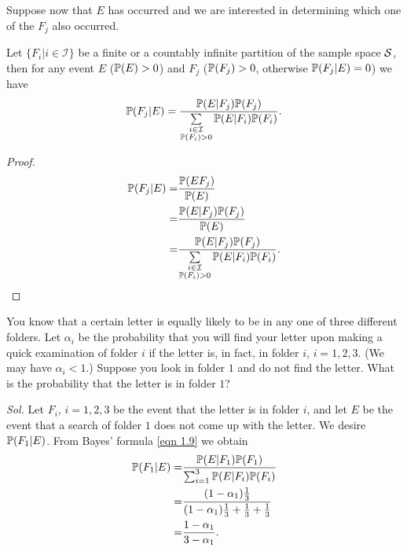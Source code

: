 Suppose now that $E$ has occurred and we are interested in determining which one of the $F_j$ also occurred.

\begin{theorem}
    Let $\{ F_i | i \in \mathcal{I} \}$ be a finite or a countably infinite partition of the sample space $\mathcal{S}$, then for any event $E$ ($ \mathbb{P} (E) > 0$) and $F_j$ ($\mathbb{P} (F_j) > 0$, otherwise $\mathbb{P} (F_j | E) = 0$) we have 
    \begin{equation} \label{eqn 1.9}
        \mathbb{P} (F_j | E) = \frac{\mathbb{P} (E | F_j) \mathbb{P} (F_j)}{\sum\limits_{\substack{i \in \mathcal{I} \\ \mathbb{P} (F_i) > 0}} \mathbb{P} (E | F_i) \mathbb{P} (F_i)}.
    \end{equation}

    \begin{proof}
        \begin{align*}
            \mathbb{P} (F_j | E) = & \frac{\mathbb{P} (E F_j)}{\mathbb{P} (E)} \\ 
            = & \frac{\mathbb{P} (E | F_j) \mathbb{P} (F_j)}{\mathbb{P} (E)} \\ 
            = & \frac{\mathbb{P} (E | F_j) \mathbb{P} (F_j)}{\sum\limits_{\substack{i \in \mathcal{I} \\ \mathbb{P} (F_i) > 0}} \mathbb{P} (E | F_i) \mathbb{P} (F_i)}.
        \end{align*}
    \end{proof}
\end{theorem}

\begin{example}
    You know that a certain letter is equally likely to be in any one of
    three different folders. Let $\alpha_i$ be the probability that you will find your letter upon making a quick examination of folder $i$ if the letter is, in fact, in folder $i$, $i = 1, 2, 3$. (We may have $\alpha_i < 1$.) Suppose you look in folder $1$ and do not find the letter. What is the probability that the letter is in folder $1$?

    \textit{ Sol. } Let $F_i$, $i = 1,2,3$ be the event that the letter is in folder $i$, and let $E$ be the event that a search of folder $1$ does not come up with the letter. We desire $\mathbb{P} (F_1 | E)$. From Bayes' formula \eqref{eqn 1.9} we obtain 
    \begin{align*}
        \mathbb{P} (F_1 | E) = & \frac{\mathbb{P} (E | F_1) \mathbb{P} (F_1)}{\sum_{i = 1}^3 \mathbb{P} (E | F_i) \mathbb{P} (F_i)} \\ 
        = & \frac{(1 - \alpha_1) \frac{1}{3}}{(1 - \alpha_1)\frac{1}{3} + \frac{1}{3} + \frac{1}{3}} \\ 
        = & \frac{1 - \alpha_1}{3 - \alpha_1}.
    \end{align*}
\end{example}
